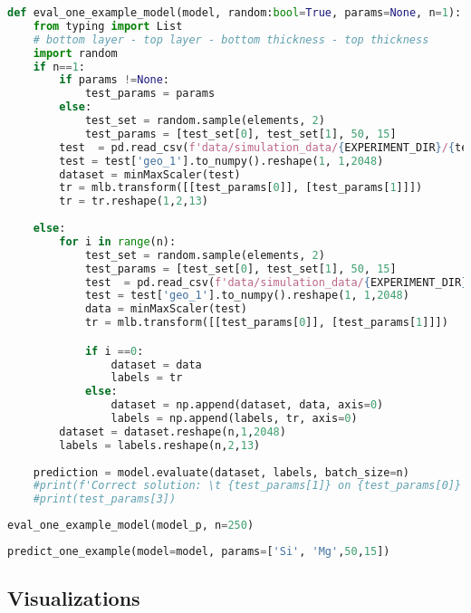 \begin{lstlisting}[language=Python]
def eval_one_example_model(model, random:bool=True, params=None, n=1):
    from typing import List
    # bottom layer - top layer - bottom thickness - top thickness
    import random
    if n==1:
        if params !=None:
            test_params = params
        else:
            test_set = random.sample(elements, 2)
            test_params = [test_set[0], test_set[1], 50, 15]
        test  = pd.read_csv(f'data/simulation_data/{EXPERIMENT_DIR}/{test_params[0]}_{test_params[2]}_{test_params[1]}_{test_params[3]}_spectra.spcreg1.spc', sep='\s+')
        test = test['geo_1'].to_numpy().reshape(1, 1,2048)
        dataset = minMaxScaler(test)
        tr = mlb.transform([[test_params[0]], [test_params[1]]])
        tr = tr.reshape(1,2,13)
    
    else: 
        for i in range(n):
            test_set = random.sample(elements, 2)
            test_params = [test_set[0], test_set[1], 50, 15]
            test  = pd.read_csv(f'data/simulation_data/{EXPERIMENT_DIR}/{test_params[0]}_{test_params[2]}_{test_params[1]}_{test_params[3]}_separate_spectra.spcreg1.spc', sep='\s+')
            test = test['geo_1'].to_numpy().reshape(1, 1,2048)
            data = minMaxScaler(test)
            tr = mlb.transform([[test_params[0]], [test_params[1]]])

            if i ==0:
                dataset = data
                labels = tr
            else:
                dataset = np.append(dataset, data, axis=0)
                labels = np.append(labels, tr, axis=0)
        dataset = dataset.reshape(n,1,2048)
        labels = labels.reshape(n,2,13)
        
    prediction = model.evaluate(dataset, labels, batch_size=n)
    #print(f'Correct solution: \t {test_params[1]} on {test_params[0]}')
    #print(test_params[3])
\end{lstlisting}

\begin{lstlisting}[language=Python]
eval_one_example_model(model_p, n=250)
\end{lstlisting}

\begin{lstlisting}[language=Python]
predict_one_example(model=model, params=['Si', 'Mg',50,15])
\end{lstlisting}

\hypertarget{visualizations}{%
\subsection{Visualizations}\label{visualizations}}

